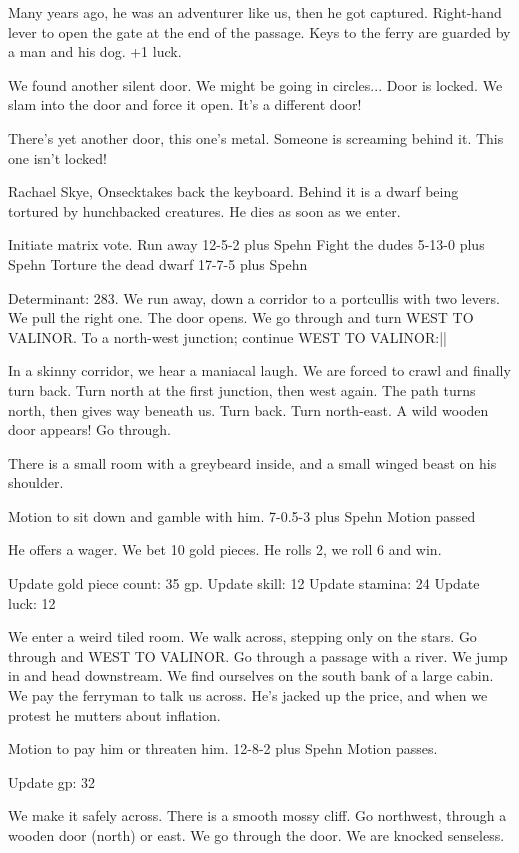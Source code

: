 \documentclass[10pt]{article}
\newcommand{\ps}{ plus Spehn\xspace}
\newcommand{\onseck}{Rachael Skye, Onseck}
\newcommand{\wtv}{WEST TO VALINOR}
\begin{document}
Many years ago, he was an adventurer like us, then he  got captured.  Right-hand lever to open the gate at the end of the passage.  Keys to the ferry are guarded by a man and his dog.  +1 luck.

We found another silent door.  We might be going in circles...  Door is locked.  We slam into the door and force it open.  It's a different door!

There's yet another door, this one's metal.  Someone is screaming behind it.  This one isn't locked!  

\onseck takes back the keyboard.
Behind it is a dwarf being tortured by hunchbacked creatures. He dies as soon as we enter.

Initiate matrix vote.
Run away
12-5-2\ps
Fight the dudes
5-13-0\ps
Torture the dead dwarf
17-7-5\ps

Determinant: 283. We run away, down a corridor to a portcullis with two levers. We pull the right one. The door opens. We go through and turn \wtv. To a north-west junction; continue \wtv:||

In a skinny corridor, we hear a maniacal laugh. We are forced to crawl and finally turn back. Turn north at the first junction, then west again. The path turns north, then gives way beneath us. Turn back. Turn north-east. A wild wooden door appears! Go through.

There is a small room with a greybeard inside, and a small winged beast on his shoulder.

Motion to sit down and gamble with him.
7-0.5-3\ps
Motion passed

He offers a wager. We bet 10 gold pieces. He rolls 2, we roll 6 and win.

Update gold piece count: 35 gp.
Update skill: 12
Update stamina: 24
Update luck: 12

We enter a weird tiled room. We walk across, stepping only on the stars. Go through and \wtv.
Go through a passage with a river. We jump in and head downstream. We find ourselves on the south bank of a large cabin. We pay the ferryman to talk us across. He's jacked up the price, and when we protest he mutters about inflation.

Motion to pay him or threaten him.
12-8-2\ps
Motion passes.

Update gp: 32

We make it safely across. There is a smooth mossy cliff. Go northwest, through a wooden door (north) or east. We go through the door. We are knocked senseless.
\end{document}

